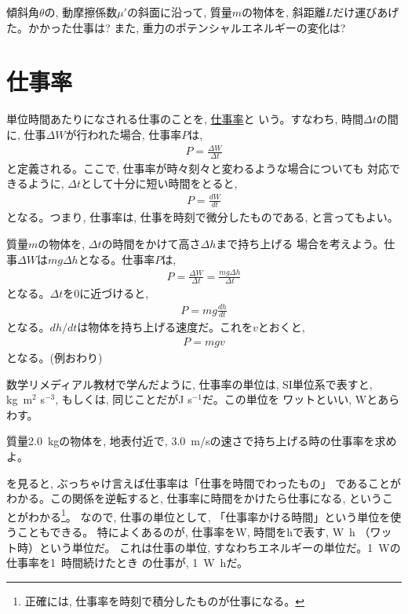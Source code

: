 \begin{q}\label{q:slope_lift_energy2}
傾斜角$\theta$の, 動摩擦係数$\mu'$の斜面に沿って, 質量$m$の物体を, 
斜距離$L$だけ運びあげた。かかった仕事は? また, 重力のポテンシャルエネルギーの変化は? 
\end{q}
\hv


\section{仕事率}
単位時間あたりになされる仕事のことを, \underline{仕事率}と
いう。すなわち, 時間$\Delta t$の間に, 仕事$\Delta W$が行われた場合, 仕事率$P$は, 
\begin{eqnarray}P = \frac{\Delta W}{\Delta t}\label{eq:work_rate0}\end{eqnarray}
と定義される。ここで, 仕事率が時々刻々と変わるような場合についても
対応できるように, $\Delta t$として十分に短い時間をとると, 
\begin{eqnarray}P = \frac{dW}{dt}\end{eqnarray}
となる。つまり, 仕事率は, 仕事を時刻で微分したものである, と言ってもよい。\mv

\begin{exmpl}
質量$m$の物体を, $\Delta t$の時間をかけて高さ$\Delta h$まで持ち上げる
場合を考えよう。仕事$\Delta W$は$mg\Delta h$となる。仕事率$P$は, 
\begin{eqnarray}P= \frac{\Delta W}{\Delta t}= \frac{mg \Delta h}{\Delta t}\end{eqnarray}
となる。$\Delta t$を0に近づけると, 
\begin{eqnarray}P= mg\frac{dh}{dt}\end{eqnarray}
となる。$dh/dt$は物体を持ち上げる速度だ。これを$v$とおくと, 
\begin{eqnarray}P= mgv\label{eq:work_rate_lift}\end{eqnarray}
となる。(例おわり)
\end{exmpl}

数学リメディアル教材で学んだように, 仕事率の単位は, SI単位系で表すと, 
kg~m$^2$ s$^{-3}$, もしくは, 同じことだがJ s$^{-1}$だ。この単位を
ワットといい, Wとあらわす。\mv

\begin{q}\label{q:work_rate}
質量2.0~kgの物体を, 地表付近で, 3.0~m/sの速さで持ち上げる時の仕事率を求めよ。
\end{q}

を見ると, ぶっちゃけ言えば仕事率は「仕事を時間でわったもの」
であることがわかる。この関係を逆転すると, 仕事率に時間をかけたら仕事になる, 
ということがわかる\footnote{正確には, 仕事率を時刻で積分したものが仕事になる。}。
なので, 仕事の単位として, 「仕事率かける時間」という単位を使うこともできる。
特によくあるのが, 仕事率をW, 時間をhで表す, W~h （ワット時）という単位だ。
これは仕事の単位, すなわちエネルギーの単位だ。1~Wの仕事率を1~時間続けたとき
の仕事が, 1~W~hだ。

